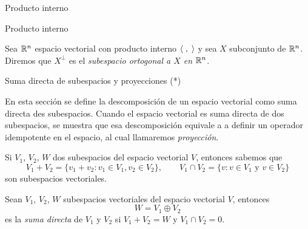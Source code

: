 \begin{chapter}{Producto interno}
\begin{section}{Producto interno}
        \begin{definicion}
            Sea $\mathbb R^n$ espacio vectorial con producto interno $\langle \;,\;\rangle$ y sea $X$ subconjunto de $\mathbb R^n$. Diremos que $X^\perp$ es el  \textit{subespacio  ortogonal a $X$ en $\mathbb R^n$}.   
        \end{definicion}

    
    \end{section}


    
	\begin{section}{Suma directa de subespacios y proyecciones  (*)}
		
		En esta sección se define la descomposición de un espacio vectorial como suma directa des subespacios. Cuando el espacio vectorial es suma directa de dos subespacios, se muestra que esa descomposición equivale a a definir un operador idempotente en el espacio, al cual llamaremos \textit{proyección}. 
		
		\medskip
		
		Si  $V_1$, $V_2$, $W$  dos subespacios del espacio vectorial $V$,  entonces sabemos que 
		\begin{equation*}
		V_1 + V_2 = \{v_1+v_2: v_1 \in V_1, v_2 \in V_2\}, \qquad V_1 \cap V_2 = \{v: v \in V_1 \text{ y } v \in V_2 \}
		\end{equation*}
		son subespacios vectoriales. 
		
		\begin{definicion} Sean $V_1$, $V_2$, $W$  subespacios vectoriales del espacio vectorial $V$, entonces 
			\begin{equation*}
			W = V_1 \oplus V_2
			\end{equation*}
			es la \textit{suma directa} de $V_1$ y $V_2$ si $V_1 + V_2 = W$ y $V_1 \cap V_2 = 0$. 
		\end{definicion}
		

\end{section}
\end{chapter}
